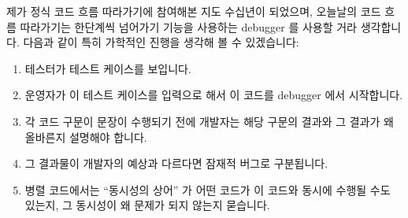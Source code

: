 제가 정식 코드 흐름 따라가기에 참여해본 지도 수십년이 되었으며, 오늘날의 코드
흐름 따라가기는 한단계씩 넘어가기 기능을 사용하는 debugger 를 사용할 거라
생각합니다.
다음과 같이 특히 가학적인 진행을 생각해 볼 수 있겠습니다:

\begin{enumerate}
\item	테스터가 테스트 케이스를 보입니다.
\item	운영자가 이 테스트 케이스를 입력으로 해서 이 코드를 debugger 에서
	시작합니다.
\item	각 코드 구문이 문장이 수행되기 전에 개발자는 해당 구문의 결과와 그
	결과가 왜 올바른지 설명해야 합니다.
\item	그 결과물이 개발자의 예상과 다르다면 잠재적 버그로 구분됩니다.
\item	병렬 코드에서는 ``동시성의 상어'' 가 어떤 코드가 이 코드와 동시에
	수행될 수도 있는지, 그 동시성이 왜 문제가 되지 않는지 묻습니다.

\end{enumerate}

